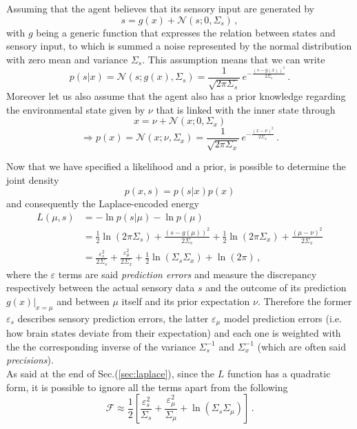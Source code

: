 \documentclass[10pt]{article}
\begin{document}
Assuming that the agent believes that its sensory input are generated by
\begin{equation}
s = g(x) + \mathcal{N}(s;0,\Sigma_s) \, ,
\label{eq:input}
\end{equation}
with $g$ being a generic function that expresses the relation between states and sensory input, to which is summed a noise represented by the normal distribution with zero mean and variance $\Sigma_s$. This assumption means that we can write
\begin{equation}
p(s|x) = \mathcal{N}(s;g(x),\Sigma_s) = \frac{1}{\sqrt{ 2 \pi \Sigma_{s}}} \, e^{-\frac{(s-g(x))^2}{2 \Sigma_{s}}} \, .
\end{equation}
Moreover let us also assume that the agent also has a prior knowledge regarding the environmental state given by $\nu$ that is linked with the inner state through
\begin{equation}
x = \nu + \mathcal{N}(x;0,\Sigma_{x})
\end{equation}
\begin{equation}
\Rightarrow p(x) = \mathcal{N}(x;\nu,\Sigma_{x}) =\frac{1}{\sqrt{ 2 \pi \Sigma_{x}}} \, e^{-\frac{(x-\nu)^2}{2 \Sigma_{x}}} \, .
\end{equation}

Now that we have specified a likelihood and a prior, is possible to determine the joint density
\begin{equation}
p(x,s) = p(s | x) p(x)
\label{eq:gm}
\end{equation}
and consequently the Laplace-encoded energy
\begin{equation}
\begin{split}
L(\mu,s) & = - \ln p(s|\mu) - \ln p(\mu)  \\
		 & = \frac{1}{2} \ln (2 \pi \Sigma_{s}) + \frac{(s-g(\mu))^2}{2 \Sigma_{s}} + \frac{1}{2} \ln (2 \pi \Sigma_{x}) + \frac{(\mu-\nu)^2}{2 \Sigma_{x}} \\
		 & = \frac{\varepsilon_{s}^2}{2 \Sigma_{s}} + \frac{\varepsilon_{\mu}^2}{2 \Sigma_{x}} + \frac{1}{2} \ln \left( \Sigma_{s} \Sigma_{x} \right) + \ln (2 \pi) \, ,
\end{split}
\end{equation}
where the $\varepsilon$ terms are said \emph{prediction errors} and measure the discrepancy respectively between the actual sensory data $s$ and the outcome of its prediction $g(x)|_{x=\mu}$ and between $\mu$ itself and its prior expectation $\nu$. Therefore the former $\varepsilon_{s}$ describes sensory prediction errors, the latter $\varepsilon_{\mu}$ model prediction errors (i.e. how brain states deviate from their expectation) and each one is weighted with the the corresponding inverse of the variance $\Sigma_{s}^{-1}$ and $\Sigma_{x}^{-1}$ (which are often said \emph{precisions}). \\
As said at the end of Sec.(\ref{sec:laplace}), since the $L$ function has a quadratic form, it is possible to ignore all the terms apart from the following
\begin{equation}
\mathcal{F} \approx \frac{1}{2} \left[\frac{\varepsilon_{s}^2}{\Sigma_{s}} + \frac{\varepsilon_{\mu}^2}{ \Sigma_{\mu}} + \ln \left( \Sigma_{s} \Sigma_{\mu} \right) \right] \, .
\end{equation}
\end{document}
